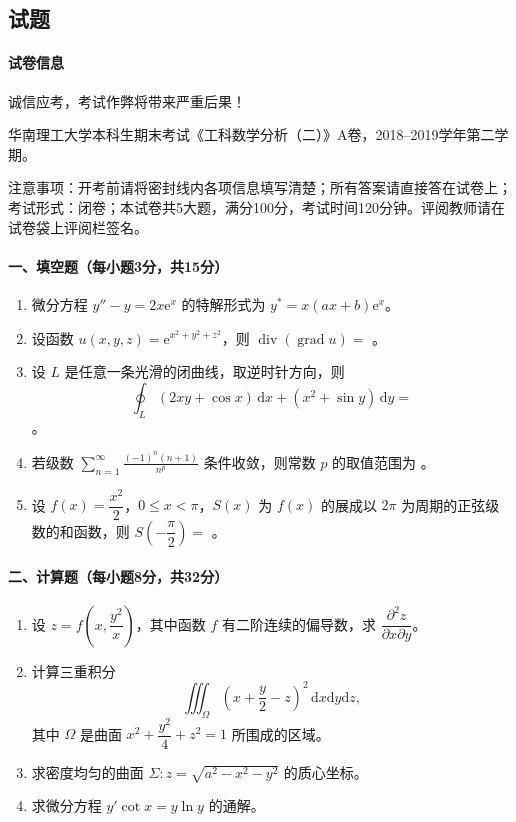 \subsection{试题}

\paragraph*{试卷信息}
诚信应考，考试作弊将带来严重后果！

华南理工大学本科生期末考试《工科数学分析（二）》A卷，2018--2019学年第二学期。

注意事项：开考前请将密封线内各项信息填写清楚；所有答案请直接答在试卷上；考试形式：闭卷；本试卷共5大题，满分100分，考试时间120分钟。评阅教师请在试卷袋上评阅栏签名。

\paragraph*{一、填空题（每小题3分，共15分）}
\begin{enumerate}
  \item 微分方程 \(y''-y=2x\mathrm{e}^x\) 的特解形式为 \(y^*=x(ax+b)\mathrm{e}^x\)。
  \item 设函数 \(u(x,y,z)=\mathrm{e}^{x^2+y^2+z^2}\)，则 \(\operatorname{div}(\operatorname{grad}u)=\) \underline{\hspace{5cm}}。
  \item 设 \(L\) 是任意一条光滑的闭曲线，取逆时针方向，则
  \[
    \oint_L(2xy+\cos x)\,\mathrm{d}x+(x^2+\sin y)\,\mathrm{d}y=
  \]
  \underline{\hspace{5cm}}。
  \item 若级数 \(\displaystyle \sum_{n=1}^{\infty}\frac{(-1)^n(n+1)}{n^p}\) 条件收敛，则常数 \(p\) 的取值范围为 \underline{\hspace{5cm}}。
  \item 设 \(f(x)=\dfrac{x^2}{2}\)，\(0\le x<\pi\)，\(S(x)\) 为 \(f(x)\) 的展成以 \(2\pi\) 为周期的正弦级数的和函数，则
  \(S\left(-\dfrac{\pi}{2}\right)=\) \underline{\hspace{5cm}}。
\end{enumerate}

\paragraph*{二、计算题（每小题8分，共32分）}
\begin{enumerate}
  \item 设 \(z=f\left(x,\dfrac{y^2}{x}\right)\)，其中函数 \(f\) 有二阶连续的偏导数，求
  \(\dfrac{\partial^2 z}{\partial x\partial y}\)。

  \item 计算三重积分
  \[
    \iiint_\Omega \left(x+\frac y2-z\right)^2\,\mathrm{d}x\mathrm{d}y\mathrm{d}z,
  \]
  其中 \(\Omega\) 是曲面 \(x^2+\dfrac{y^2}{4}+z^2=1\) 所围成的区域。

  \item 求密度均匀的曲面 \(\Sigma:z=\sqrt{a^2-x^2-y^2}\) 的质心坐标。

  \item 求微分方程 \(y'\cot x=y\ln y\) 的通解。
\end{enumerate}

